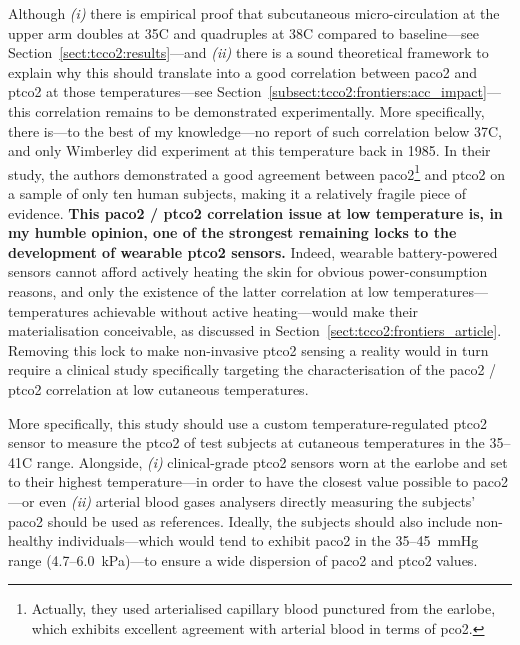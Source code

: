 Although \textit{(i)} there is empirical proof that subcutaneous micro-circulation at the upper arm doubles at 35{\degree}C and quadruples at 38{\degree}C compared to baseline---see Section~\ref{sect:tcco2:results}---and \textit{(ii)} there is a sound theoretical framework to explain why this should translate into a good correlation between \gls{paco2} and \gls{ptco2} at those temperatures---see Section~\ref{subsect:tcco2:frontiers:acc_impact}---this correlation remains to be demonstrated experimentally. More specifically, there is---to the best of my knowledge---no report of such correlation below 37{\degree}C, and only Wimberley \etal{} did experiment at this temperature back in 1985\cite{wimberley1985a}. In their study, the authors demonstrated a good agreement between \gls{paco2}\footnote{Actually, they used arterialised capillary blood punctured from the earlobe, which exhibits excellent agreement with arterial blood in terms of \gls{pco2}\cite{zavorsky2007}.} and \gls{ptco2} on a sample of only ten human subjects, making it a relatively fragile piece of evidence. \textbf{This \gls{paco2} / \gls{ptco2} correlation issue at low temperature is, in my humble opinion, one of the strongest remaining locks to the development of wearable \gls{ptco2} sensors.} Indeed, wearable battery-powered sensors cannot afford actively heating the skin for obvious power-consumption reasons, and only the existence of the latter correlation at low temperatures---\ie{} temperatures achievable without active heating---would make their materialisation conceivable, as discussed in Section~\ref{sect:tcco2:frontiers_article}. Removing this lock to make non-invasive \gls{ptco2} sensing a reality would in turn require a clinical study specifically targeting the characterisation of the \gls{paco2} / \gls{ptco2} correlation at low cutaneous temperatures.

More specifically, this study should use a custom temperature-regulated \gls{ptco2} sensor to measure the \gls{ptco2} of test subjects at cutaneous temperatures in the 35--41{\degree}C range. Alongside, \textit{(i)} clinical-grade \gls{ptco2} sensors worn at the earlobe and set to their highest temperature---in order to have the closest value possible to \gls{paco2}\cite{conway2018}---or even \textit{(ii)} arterial blood gases analysers directly measuring the subjects' \gls{paco2} should be used as references. Ideally, the subjects should also include non-healthy individuals---which would tend to exhibit \gls{paco2} in the 35--45~mmHg range (4.7--6.0~kPa)---to ensure a wide dispersion of \gls{paco2} and \gls{ptco2} values.

